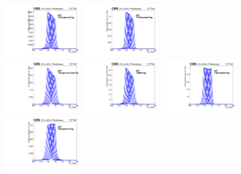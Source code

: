 \begin{figure}[ht!]
\centering
\includegraphics[width=0.3\textwidth]{modellingFigures/DCBpG/ggh_TTHLeptonicTag_fmc_interp.pdf} 
\includegraphics[width=0.3\textwidth]{modellingFigures/DCBpG/ggh_TTHHadronicTag_fmc_interp.pdf}\\ 
\includegraphics[width=0.3\textwidth]{modellingFigures/DCBpG/ggh_VHLeptoniclooseTag_fmc_interp.pdf} 
\includegraphics[width=0.3\textwidth]{modellingFigures/DCBpG/ggh_VHMetTag_fmc_interp.pdf} 
\includegraphics[width=0.3\textwidth]{modellingFigures/DCBpG/ggh_VHHadronicTag_fmc_interp.pdf} \\
\includegraphics[width=0.3\textwidth]{modellingFigures/DCBpG/ggh_WHLeptonicTag_fmc_interp.pdf} 

\end{figure}
